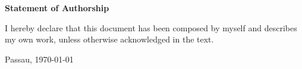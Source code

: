 \documentclass{thesisclass}
\begin{document}

\frontmatter
{}

\blankpage


\thispagestyle{plain}

\vspace*{\fill}

\centerline{\textbf{Statement of Authorship}}

\vspace{0.25cm}

I hereby declare that this document has been composed by myself and describes my own work, unless otherwise acknowledged in the text.

\vspace{2.5cm}

\hspace{0.25cm} Passau, \today

\vspace{2cm}

\blankpage


\thispagestyle{plain}
\end{document}
